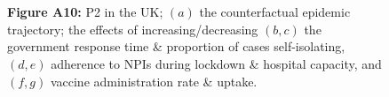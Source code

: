 \documentclass[paper=a4,fontsize=11pt]{article}
\begin{document}
\begin{figure}[!h]
  \\
  \hspace{1.76cm}
  \\
  \caption*{\textbf{Figure A10:} P2 in the UK; $(a)$ the counterfactual epidemic trajectory; the effects of increasing/decreasing $(b,c)$ the government response time \& proportion of cases self-isolating, $(d,e)$ adherence to NPIs during lockdown \& hospital capacity, and $(f,g)$ vaccine administration rate \& uptake.}
\end{figure}
\end{document}
